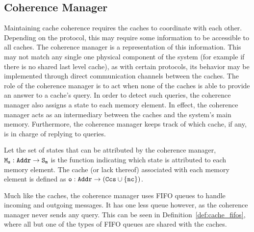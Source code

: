 \subsection{Coherence Manager}
Maintaining cache coherence requires the caches to coordinate with each other.
Depending on the protocol, this may require some information to be accessible
to all caches. The coherence manager is a representation of this information.
This may not match any single one physical component of the system (for example
if there is no shared last level cache), as with certain protocols, its
behavior may be implemented through direct communication channels between the
caches. The role of the coherence manager is to act when none of the caches is
able to provide an answer to a cache's query. In order to detect such queries,
the coherence manager also assigns a state to each memory element. In effect,
the coherence manager acts as an intermediary between the caches and the
system's main memory. Furthermore, the coherence manager keeps track of which
cache, if any, is in charge of replying to queries.

\begin{definition}
\label{def:cmgr_info}
Let \coherencemanagerstate{} the set of states that can be attributed by the
coherence manager, $\text{\texttt{M\textsubscript{s}}}{} : \text{\texttt{Addr}}{} \to
\text{\texttt{S\textsubscript{m}}}{}$ is the function indicating which state is attributed
to each memory element. The cache (or lack thereof) associated with each memory
element is defined as $\text{\texttt{o}}{} : \text{\texttt{Addr}}{} \to
(\text{\texttt{Ccs}}{} \cup \{\text{\texttt{nc}}{}\})$.
\end{definition}

Much like the caches, the coherence manager uses FIFO queues to handle incoming
and outgoing messages. It has one less queue however, as the coherence manager
never sends any query. This can be seen in Definition~\ref{def:cache_fifos},
where all but one of the types of FIFO queues are shared with the caches.

